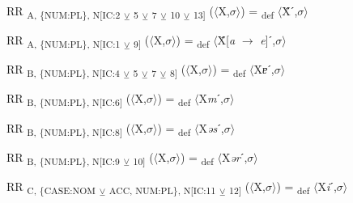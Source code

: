 {\begin{styleNoSpacing}
\begin{exe}
 RR \textsubscript{A, \{NUM:PL\}, N[IC:2} \textsubscript{${\veebar}$}\textsubscript{ 5} \textsubscript{${\veebar}$}\textsubscript{ 7} \textsubscript{${\veebar}$}\textsubscript{ 10} \textsubscript{${\veebar}$}\textsubscript{ 13]} ($\langle$X,$\sigma $$\rangle$) = \textsubscript{def} $\langle$Ẍˊ,$\sigma $$\rangle$
\end{exe}

\begin{exe}
 RR \textsubscript{A, \{NUM:PL\}, N[IC:1} \textsubscript{${\veebar}$}\textsubscript{ 9]} ($\langle$X,$\sigma $$\rangle$) = \textsubscript{def} $\langle$Ẍ[\textit{a} $\rightarrow$ \textit{e}]ˊ,$\sigma $$\rangle$
\end{exe}

\begin{exe}
 RR \textsubscript{B, \{NUM:PL\}, N[IC:4} \textsubscript{${\veebar}$}\textsubscript{ 5} \textsubscript{${\veebar}$}\textsubscript{ 7} \textsubscript{${\veebar}$}\textsubscript{ 8]} ($\langle$X,$\sigma $$\rangle$) = \textsubscript{def} $\langle$X\textit{ɐ}ˊ,$\sigma $$\rangle$
\end{exe}\end{styleNoSpacing}

\begin{exe}
 RR \textsubscript{B, \{NUM:PL\}, N[IC:6]} ($\langle$X,$\sigma $$\rangle$) = \textsubscript{def} $\langle$X\textit{m}ˊ,$\sigma $$\rangle$
\end{exe}

\begin{exe}
 RR \textsubscript{B, \{NUM:PL\}, N[IC:8]} ($\langle$X,$\sigma $$\rangle$) = \textsubscript{def} $\langle$X\textit{əs}ˊ,$\sigma $$\rangle$
\end{exe}

\begin{exe}
 RR \textsubscript{B, \{NUM:PL\}, N[IC:9} \textsubscript{${\veebar}$}\textsubscript{ 10]} ($\langle$X,$\sigma $$\rangle$) = \textsubscript{def} $\langle$X\textit{ər}ˊ,$\sigma $$\rangle$
\end{exe}

\begin{exe}
 RR \textsubscript{C, \{CASE:NOM} \textsubscript{${\veebar}$}\textsubscript{ ACC, NUM:PL\}, N[IC:11} \textsubscript{${\veebar}$}\textsubscript{ 12]} ($\langle$X,$\sigma $$\rangle$) = \textsubscript{def} $\langle$X\textit{i}ˊ,$\sigma $$\rangle$
\end{exe}

}
